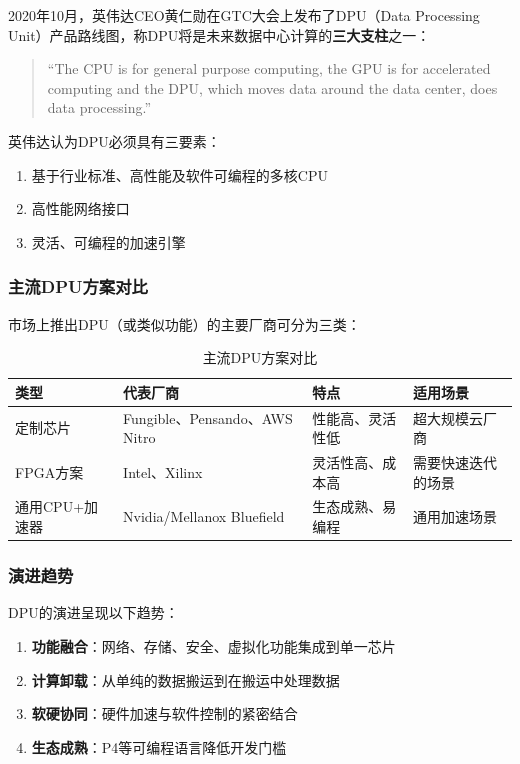 2020年10月，英伟达CEO黄仁勋在GTC大会上发布了DPU（Data Processing Unit）产品路线图，称DPU将是未来数据中心计算的\textbf{三大支柱}之一：

\begin{quote}
``The CPU is for general purpose computing, the GPU is for accelerated computing and the DPU, which moves data around the data center, does data processing.''
\end{quote}

英伟达认为DPU必须具有三要素：
\begin{enumerate}
    \item 基于行业标准、高性能及软件可编程的多核CPU
    \item 高性能网络接口
    \item 灵活、可编程的加速引擎
\end{enumerate}

\subsubsection{主流DPU方案对比}

市场上推出DPU（或类似功能）的主要厂商可分为三类：

\begin{table}[htbp]
\centering
\caption{主流DPU方案对比}
\begin{tabular}{|l|l|l|l|}
\hline
\textbf{类型} & \textbf{代表厂商} & \textbf{特点} & \textbf{适用场景} \\
\hline
定制芯片 & Fungible、Pensando、AWS Nitro & 性能高、灵活性低 & 超大规模云厂商 \\
\hline
FPGA方案 & Intel、Xilinx & 灵活性高、成本高 & 需要快速迭代的场景 \\
\hline
通用CPU+加速器 & Nvidia/Mellanox Bluefield & 生态成熟、易编程 & 通用加速场景 \\
\hline
\end{tabular}
\end{table}

\subsubsection{演进趋势}

DPU的演进呈现以下趋势：
\begin{enumerate}
    \item \textbf{功能融合}：网络、存储、安全、虚拟化功能集成到单一芯片
    \item \textbf{计算卸载}：从单纯的数据搬运到在搬运中处理数据
    \item \textbf{软硬协同}：硬件加速与软件控制的紧密结合
    \item \textbf{生态成熟}：P4等可编程语言降低开发门槛
\end{enumerate}

